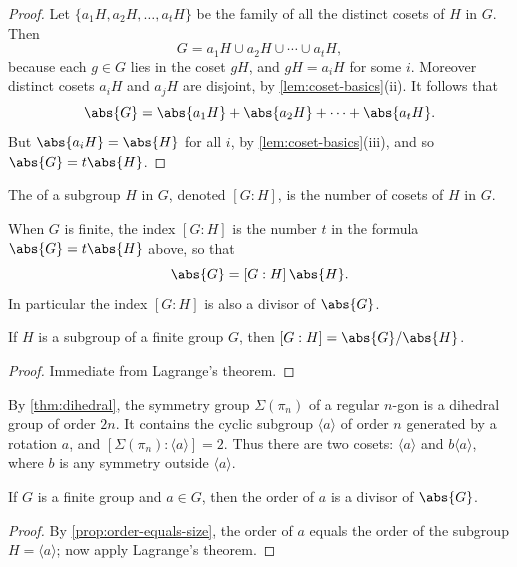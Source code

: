 \begin{proof}
	Let \(\{a_1H, a_2H, \dots, a_tH\}\) be the family of all the distinct cosets of \(H\) in
	\(G\). Then
	\[
		G = a_1H \cup a_2H \cup \cdots \cup a_tH,
	\]
	because each \(g \in G\) lies in the coset \(gH\), and \(gH = a_iH\) for some \(i\).
	Moreover distinct cosets \(a_iH\) and \(a_jH\) are disjoint, by
	\autoref{lem:coset-basics}(ii). It follows that
	\[
		\abs{G} = \abs{a_1H} + \abs{a_2H} + \cdots + \abs{a_tH}.
	\]
	But \(\abs{a_iH} = \abs{H}\) for all \(i\), by \autoref{lem:coset-basics}(iii), and so
	\(\abs{G} = t\abs{H}\).
\end{proof}

\begin{definition}[Index]
	The  of a subgroup \(H\) in \(G\), denoted \([G:H]\), is the number of
	cosets of \(H\) in \(G\).
\end{definition}

When \(G\) is finite, the index \([G:H]\) is the number \(t\) in the formula
\(\abs{G} = t\abs{H}\) above, so that
\[
	\abs{G} = [G:H]\,\abs{H}.
\]
In particular the index \([G:H]\) is also a divisor of \(\abs{G}\).

\begin{corollary}\label{cor:index-formula}
	If \(H\) is a subgroup of a finite group \(G\), then \([G:H] = \abs{G}/\abs{H}\).
\end{corollary}

\begin{proof}
	Immediate from Lagrange's theorem.
\end{proof}

\begin{eg}
	By \autoref{thm:dihedral}, the symmetry group \(\Sigma(\pi_n)\) of a regular
	\(n\)-gon is a dihedral group of order \(2n\). It contains the cyclic subgroup
	\(\langle a\rangle\) of order \(n\) generated by a rotation \(a\), and
	\([\Sigma(\pi_n) : \langle a\rangle] = 2\). Thus there are two cosets:
	\(\langle a\rangle\) and \(b\langle a\rangle\), where \(b\) is any symmetry outside
	\(\langle a\rangle\).
\end{eg}

\begin{corollary}\label{cor:order-divides-group}
	If \(G\) is a finite group and \(a \in G\), then the order of \(a\) is a divisor of
	\(\abs{G}\).
\end{corollary}

\begin{proof}
	By \autoref{prop:order-equals-size}, the order of \(a\) equals the order of the
	subgroup \(H = \langle a\rangle\); now apply Lagrange's theorem.
\end{proof}

